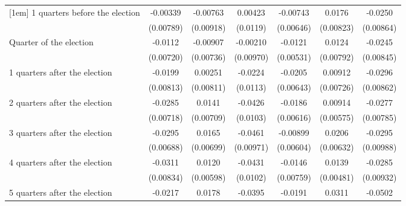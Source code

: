 \begin{table}[!ht]
\begin{tabular}{l*{6}{c}}
[1em]
 1 quarters before the election&    -0.00339         &    -0.00763         &     0.00423         &    -0.00743         &      0.0176\sym{*}  &     -0.0250\sym{**} \\
                    &   (0.00789)         &   (0.00918)         &    (0.0119)         &   (0.00646)         &   (0.00823)         &   (0.00864)         \\
[1em]
Quarter of the election&     -0.0112         &    -0.00907         &    -0.00210         &     -0.0121\sym{*}  &      0.0124         &     -0.0245\sym{**} \\
                    &   (0.00720)         &   (0.00736)         &   (0.00970)         &   (0.00531)         &   (0.00792)         &   (0.00845)         \\
[1em]
 1 quarters after the election&     -0.0199\sym{*}  &     0.00251         &     -0.0224\sym{*}  &     -0.0205\sym{**} &     0.00912         &     -0.0296\sym{***}\\
                    &   (0.00813)         &   (0.00811)         &    (0.0113)         &   (0.00643)         &   (0.00726)         &   (0.00862)         \\
[1em]
 2 quarters after the election&     -0.0285\sym{***}&      0.0141\sym{*}  &     -0.0426\sym{***}&     -0.0186\sym{**} &     0.00914         &     -0.0277\sym{***}\\
                    &   (0.00718)         &   (0.00709)         &    (0.0103)         &   (0.00616)         &   (0.00575)         &   (0.00785)         \\
[1em]
 3 quarters after the election&     -0.0295\sym{***}&      0.0165\sym{*}  &     -0.0461\sym{***}&    -0.00899         &      0.0206\sym{**} &     -0.0295\sym{**} \\
                    &   (0.00688)         &   (0.00699)         &   (0.00971)         &   (0.00604)         &   (0.00632)         &   (0.00988)         \\
[1em]
 4 quarters after the election&     -0.0311\sym{***}&      0.0120\sym{*}  &     -0.0431\sym{***}&     -0.0146         &      0.0139\sym{**} &     -0.0285\sym{**} \\
                    &   (0.00834)         &   (0.00598)         &    (0.0102)         &   (0.00759)         &   (0.00481)         &   (0.00932)         \\
[1em]
 5 quarters after the election&     -0.0217\sym{**} &      0.0178         &     -0.0395\sym{**} &     -0.0191\sym{**} &      0.0311\sym{**} &     -0.0502\sym{***}\\

\end{tabular}
\end{table}
